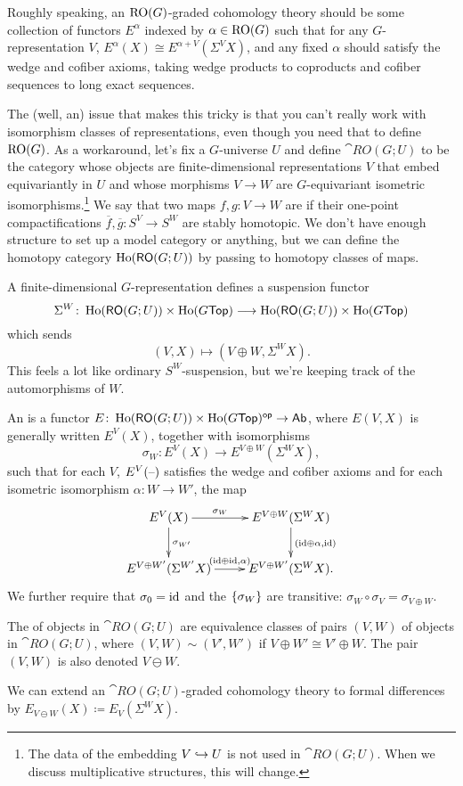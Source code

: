 Roughly speaking, an $\mathrm{RO}(G)$-graded cohomology theory should be some collection of functors $E^\alpha$ indexed by
$\alpha\in\mathrm{RO}(G)$ such that for any $G$-representation $V$, $E^\alpha(X) \cong E^{\alpha+V}(\Sigma^V X)$, and any
fixed $\alpha$ should satisfy the wedge and cofiber axioms, taking wedge products to coproducts and cofiber
sequences to long exact sequences.

The (well, an) issue that makes this tricky is that you can't really work with isomorphism classes of
representations, even though you need that to define $\mathrm{RO}(G)$. As a workaround, let's fix a $G$-universe $U$ and
define $\cat{RO}(G;U)$ to be the category whose objects are finite-dimensional representations $V$ that embed
equivariantly in $U$ and whose morphisms $V\to W$ are $G$-equivariant isometric isomorphisms.\footnote{The data of
the embedding $V\hookrightarrow U$ is not used in $\cat{RO}(G;U)$. When we discuss multiplicative structures, this will
change.} We say that two maps $f,g\colon V\to W$ are  if their one-point compactifications
$\overline f, \overline g\colon S^V\to S^W$ are stably homotopic. We don't have enough structure to set up a model
category or anything, but we can define the homotopy category $\operatorname{Ho}(\mathsf{RO}(G;U))$ by passing to homotopy classes
of maps.

A finite-dimensional $G$-representation defines a suspension functor
\[\Sigma^W\colon \operatorname{Ho}(\mathsf{RO}(G;U))\times\operatorname{Ho}(G\mathsf{Top})\longrightarrow \operatorname{Ho}(\mathsf{RO}(G;U))\times\operatorname{Ho}(G\mathsf{Top})\]
which sends
\[(V,X)\mapsto (V\oplus W, \Sigma^W X).\]
This feels a lot like ordinary $S^W$-suspension, but we're keeping track of the automorphisms of $W$.
\begin{defn}
An  is a functor
$E\colon\operatorname{Ho}(\mathsf{RO}(G;U))\times\operatorname{Ho}(G\mathsf{Top})^{\mathsf{op}}\to\mathsf{Ab}$, where $E(V,X)$ is generally written $E^V(X)$, together with
isomorphisms
\[\sigma_W\colon E^V(X)\longrightarrow E^{V\oplus W}(\Sigma^W X),\]
such that for each $V$, $E^V(\text{--})$ satisfies the wedge and cofiber axioms and for each isometric isomorphism
$\alpha\colon W\to W'$, the map
\[\xymatrix{
	E^V(X)\ar[r]^-{\sigma_W}\ar[d]^{\sigma_{W'}} & E^{V\oplus W}(\Sigma^W X)\ar[d]^{(\id\oplus\alpha, \id)}\\
	E^{V\oplus W'}(\Sigma^{W'}X)\ar[r]^{(\id\oplus\id, \alpha)} & E^{V\oplus W'}(\Sigma^W X).
}\]
We further require that $\sigma_0 = \mathrm{id}$ and the $\{\sigma_W\}$ are transitive: $\sigma_W\circ\sigma_V =
\sigma_{V\oplus W}$.
\end{defn}
\begin{defn}
The  of objects in $\cat{RO}(G;U)$ are equivalence classes of pairs $(V,W)$ of objects in
$\cat{RO}(G;U)$, where $(V,W)\sim(V',W')$ if $V\oplus W'\cong V'\oplus W$. The pair $(V,W)$ is also denoted
$V\ominus W$.
\end{defn}
We can extend an $\cat{RO}(G;U)$-graded cohomology theory to formal differences by $E_{V\ominus W}(X)\coloneqq
E_V(\Sigma^W X)$.

